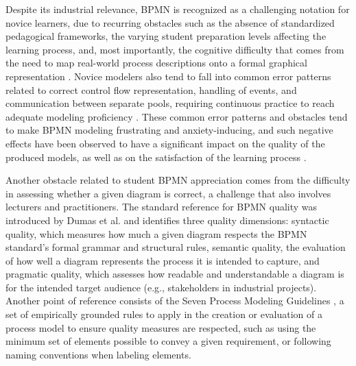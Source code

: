Despite its industrial relevance, BPMN is recognized as a challenging notation for novice learners, due to recurring obstacles such as the absence of standardized pedagogical frameworks, the varying student preparation levels affecting the learning process, and, most importantly, the cognitive difficulty that comes from the need to map real-world process descriptions onto a formal graphical representation \cite{bandara2010bpm}. Novice modelers also tend to fall into common error patterns related to correct control flow representation, handling of events, and communication between separate pools, requiring continuous practice to reach adequate modeling proficiency \cite{maslov2022towards}. These common error patterns and obstacles tend to make BPMN modeling frustrating and anxiety-inducing, and such negative effects have been observed to have a significant impact on the quality of the produced models, as well as on the satisfaction of the learning process \cite{Nobre2025ModelQA}.

Another obstacle related to student BPMN appreciation comes from the difficulty in assessing whether a given diagram is correct, a challenge that also involves lecturers and practitioners. The standard reference for BPMN quality was introduced by Dumas et al. \cite{dumas2018fundamentals} and identifies three quality dimensions: syntactic quality, which measures how much a given diagram respects the BPMN standard's formal grammar and structural rules, semantic quality, the evaluation of how well a diagram represents the process it is intended to capture, and pragmatic quality, which assesses how readable and understandable a diagram is for the intended target audience (e.g., stakeholders in industrial projects). Another point of reference consists of the Seven Process Modeling Guidelines \cite{mendling2010seven}, a set of empirically grounded rules to apply in the creation or evaluation of a process model to ensure quality measures are respected, such as using the minimum set of elements possible to convey a given requirement, or following naming conventions when labeling elements.

